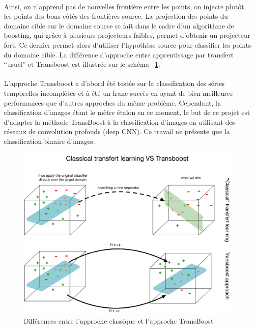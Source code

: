 \documentclass[11 pt]{article}
\begin{document}
\paragraph{}Ainsi, on n'apprend pas de nouvelles frontière entre les points, on injecte plutôt les points des bons côtés des frontières source. La projection des points du domaine cible sur le domaine source se fait dans le cadre d'un algorithme de boosting, qui grâce à plusieurs projecteurs faibles, permet d’obtenir un projecteur fort. Ce dernier permet alors d’utiliser l'hypothèse source pour classifier les points du domaine cible. La différence d'approche entre apprentissage par transfert ``usuel'' et Transboost est illustrée sur le schéma ~\ref{figDiff}.


\paragraph{}L'approche Transboost a d’abord été testée sur la classification des séries temporelles incomplètes et à été un franc succès en ayant de bien meilleures performances que d’autres approches du même problème. Cependant, la classification d’images étant le mètre étalon en ce moment, le but de ce projet est d’adapter la méthode TransBoost à la classification d’images en utilisant des réseaux de convolution profonds (deep CNN). Ce travail ne présente que la classification binaire d'images.

\begin{figure}[H]
  \includegraphics[width=\textwidth]{fig2.pdf}
  \caption{Différences entre l'approche classique et l'approche TransBoost}
  \label{figDiff}
\end{figure}
\end{document}
